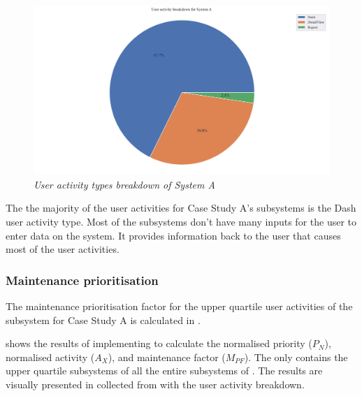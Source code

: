 \begin{figure}[!htb]
	\centering %
	\includegraphics[width=0.95\linewidth]{img/ch3/analysis/case_A_breakdown.pdf}
	\caption[User activity types breakdown of System A]
	{\textit{User activity types breakdown of System A}}\label{fig:ch3_caseABreakdown}
\end{figure} 

The  the majority of the user activities for Case Study A's subsystems is the Dash user activity type. Most of the subsystems don't have many inputs for the user to enter data on the system. It provides information back to the user that causes most of the user activities. 

\subsubsection{Maintenance prioritisation}
The maintenance prioritisation factor for the upper quartile user activities of the subsystem for Case Study A is calculated in .



 shows the results of implementing  to calculate the normalised priority ($P_N$), normalised activity ($A_X$), and maintenance factor ($M_{PF}$). The  only contains the upper quartile subsystems of all the entire subsystems of . The results are visually presented in  collected from  with the user activity breakdown.

\clearpage

